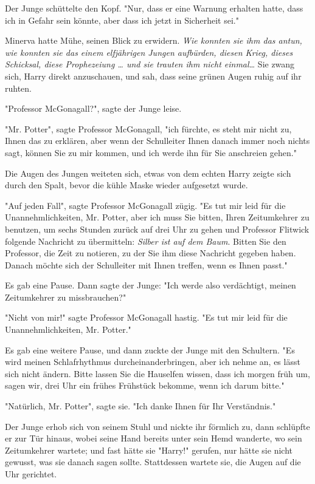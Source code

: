 {Der Junge schüttelte den Kopf. "Nur, dass er eine Warnung erhalten hatte, dass ich in Gefahr sein könnte, aber dass ich jetzt in Sicherheit sei."

Minerva hatte Mühe, seinen Blick zu erwidern. \emph{Wie konnten sie ihm das antun, wie konnten sie das einem elfjährigen Jungen aufbürden, diesen Krieg, dieses Schicksal, diese Prophezeiung … und sie trauten ihm nicht einmal…} Sie zwang sich, Harry direkt anzuschauen, und sah, dass seine grünen Augen ruhig auf ihr ruhten.

"Professor McGonagall?", sagte der Junge leise.

"Mr. Potter", sagte Professor McGonagall, "ich fürchte, es steht mir nicht zu, Ihnen das zu erklären, aber wenn der Schulleiter Ihnen danach immer noch nichts sagt, können Sie zu mir kommen, und ich werde ihn für Sie anschreien gehen."

Die Augen des Jungen weiteten sich, etwas von dem echten Harry zeigte sich durch den Spalt, bevor die kühle Maske wieder aufgesetzt wurde.

"Auf jeden Fall", sagte Professor McGonagall zügig. "Es tut mir leid für die Unannehmlichkeiten, Mr. Potter, aber ich muss Sie bitten, Ihren Zeitumkehrer zu benutzen, um sechs Stunden zurück auf drei Uhr zu gehen und Professor Flitwick folgende Nachricht zu übermitteln: \emph{Silber ist auf dem Baum}. Bitten Sie den Professor, die Zeit zu notieren, zu der Sie ihm diese Nachricht gegeben haben. Danach möchte sich der Schulleiter mit Ihnen treffen, wenn es Ihnen passt."

Es gab eine Pause. Dann sagte der Junge: "Ich werde also verdächtigt, meinen Zeitumkehrer zu missbrauchen?"

"Nicht von mir!" sagte Professor McGonagall hastig. "Es tut mir leid für die Unannehmlichkeiten, Mr. Potter."

Es gab eine weitere Pause, und dann zuckte der Junge mit den Schultern. "Es wird meinen Schlafrhythmus durcheinanderbringen, aber ich nehme an, es lässt sich nicht ändern. Bitte lassen Sie die Hauselfen wissen, dass ich morgen früh um, sagen wir, drei Uhr ein frühes Frühstück bekomme, wenn ich darum bitte."

"Natürlich, Mr. Potter", sagte sie. "Ich danke Ihnen für Ihr Verständnis."

Der Junge erhob sich von seinem Stuhl und nickte ihr förmlich zu, dann schlüpfte er zur Tür hinaus, wobei seine Hand bereits unter sein Hemd wanderte, wo sein Zeitumkehrer wartete; und fast hätte sie "Harry!" gerufen, nur hätte sie nicht gewusst, was sie danach sagen sollte. Stattdessen wartete sie, die Augen auf die Uhr gerichtet.

}
